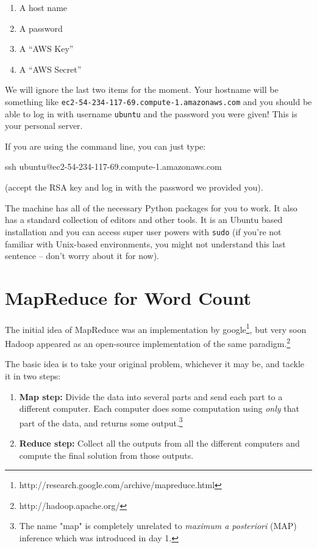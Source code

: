 \begin{enumerate}
\item A host name
\item A password
\item A ``AWS Key''
\item A ``AWS Secret''
\end{enumerate}

We will ignore the last two items for the moment.  Your hostname will be
something like \texttt{ec2-54-234-117-69.compute-1.amazonaws.com} and you
should be able to log in with username \texttt{ubuntu} and the password you
were given! This is your personal server.

If you are using the command line, you can just type:

ssh ubuntu@ec2-54-234-117-69.compute-1.amazonaws.com

(accept the RSA key and log in with the password we provided you).

The machine has all of the necessary Python packages for you to work. It also
has a standard collection of editors and other tools. It is an Ubuntu based
installation and you can access super user powers with \texttt{sudo} (if you're not familiar with Unix-based environments, you might not understand this last sentence -- don't worry about it for now).

\section{MapReduce for Word Count}



The initial idea of MapReduce was an implementation by google\footnote{http://research.google.com/archive/mapreduce.html}, but very soon
Hadoop appeared as an open-source implementation of the same paradigm.\footnote{http://hadoop.apache.org/}

The basic idea is to take your original problem, whichever it may be, and tackle it in two steps:
%
\begin{enumerate}
\item \textbf{Map step:} Divide the data into several parts and send each part to a different computer. Each computer does some computation using \emph{only} that part of the data, and returns some output.\footnote{The name "map" is completely unrelated to \emph{maximum a posteriori} (MAP) inference which was introduced in day 1.}
\item \textbf{Reduce step:} Collect all the outputs from all the different computers and compute the final solution from those outputs.
\end{enumerate}

